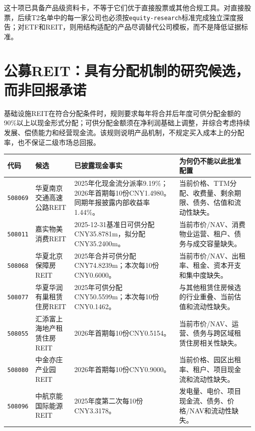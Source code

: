 这十项已具备产品级资料卡，不等于它们优于直接股票或其他合规工具。对直接股票，后续T2名单中的每一家公司也必须按\texttt{equity-research}标准完成独立深度报告；对ETF和REIT，则用结构适配的产品尽调替代公司模板，而不是降低证据标准。

\section{公募REIT：具有分配机制的研究候选，而非回报承诺}

基础设施REIT在符合分配条件时，规则要求每年将合并后年度可供分配金额的90\%以上以现金形式分配；可供分配金额须在净利润基础上调整，并综合考虑持续发展、偿债能力和经营现金流。该规则说明产品机制，不规定买入成本上的分配率，也不保证二级市场总回报。

\begin{exhibitbox}[已披露现金事实不等于可配置结论]
\footnotesize
\begin{tabularx}{\exhibitboxwidth}{L{1.4cm}L{2.6cm}L{2.2cm}P}
\toprule
\textbf{代码} & \textbf{候选} & \textbf{已披露现金事实} & \textbf{为何仍不能以此批准配置} \\
\midrule
\texttt{508069} & 华夏南京交通高速公路REIT & 2025年化现金流分派率9.19\%；2026年首期每10份CNY1.4980。同期年报披露内部收益率1.44\%。 & 当前价格、TTM分配、收费量、剩余期限、债务、估值和流动性缺失。 \\
\texttt{508011} & 嘉实物美消费REIT & 2025-12-31基准日可供分配CNY35.8781m，拟分配CNY35.2400m。 & 当前市价/NAV、消费物业运营、租户、债务与成交容量缺失。 \\
\texttt{508068} & 华夏北京保障房REIT & 2025年合并可供分配CNY74.8239m；本次每10份CNY0.6000。 & 当前市价/NAV、出租率、租金、资本开支和集中度缺失。 \\
\texttt{508077} & 华夏华润有巢租赁住房REIT & 2025年可供分配CNY50.5599m；本次每10份CNY0.1462。 & 与其他租赁住房候选的行业重叠、当前估值和流动性缺失。 \\
\texttt{508055} & 汇添富上海地产租赁住房REIT & 2026年首期每10份CNY0.5154。 & 当前市价/NAV、运营、债务与跨区域租赁住房相关性缺失。 \\
\texttt{508080} & 中金亦庄产业园REIT & 2026年首期每10份CNY0.9000。 & 当前价格、园区出租率、租户、项目现金流和流动性缺失。 \\
\texttt{508096} & 中航京能国际能源REIT & 2025年度第二次每10份CNY3.3178。 & 发电量、电价、项目现金流、债务、价格/NAV和流动性缺失。 \\
\bottomrule
\end{tabularx}
\end{exhibitbox}

